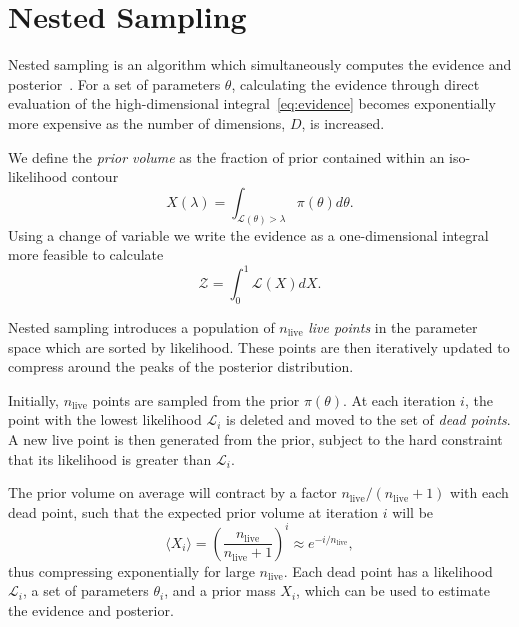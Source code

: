 \documentclass[11pt]{article}
\begin{document}
    \section{Nested Sampling}\label{sec:nested_sampling}
    Nested sampling is an algorithm which simultaneously computes
    the evidence and posterior~\cite{Skilling2006, Handley_polychord, NS_Review_2022}.
    For a set of parameters $\theta$, calculating the evidence through direct evaluation of the
    high-dimensional integral~\eqref{eq:evidence} becomes exponentially more expensive as the number of dimensions,
    $D$, is increased.

    We define the \emph{prior volume} as the fraction of prior contained within an iso-likelihood contour
    \begin{equation}\label{eq:prior_volume}
    X(\lambda) = \int_{\mathcal{L}(\theta)>\lambda} \pi(\theta) d\theta.
    \end{equation}
    Using a change of variable we write the evidence as a one-dimensional integral more feasible to calculate
    \begin{equation}\label{eq:evidence_ns}
    \mathcal{Z} = \int_0^1 {\mathcal{L}(X)} dX.
    \end{equation}

    Nested sampling introduces a population of $n_{\text{live}}$ \emph{live points} in the parameter space which are sorted
    by likelihood.
    These points are then iteratively updated to compress around the peaks of the posterior distribution.

    Initially, $n_{\text{live}}$ points are sampled from the prior $\pi(\theta)$.
    At each iteration $i$, the point with the lowest likelihood $\mathcal{L}_i$ is deleted and moved to the set
    of \emph{dead points}.
    A new live point is then generated from the prior, subject to the hard constraint that its likelihood is
    greater than $\mathcal{L}_i$.

    The prior volume on average will contract by a factor $n_{\text{live}}/(n_{\text{live}}+1)$ with each dead point, such that the
    expected prior volume at iteration $i$ will be
    \begin{equation}\label{eq:exp_prior_volume}
    \langle X_i \rangle = \left( \frac{n_{\text{live}}}{n_{\text{live}} + 1} \right)^i \approx e^{-i/n_{\text{live}}},
    \end{equation}
    thus compressing exponentially for large $n_{\text{live}}$.
    Each dead point has a likelihood $\mathcal{L}_i$, a set of parameters $\theta_i$, and a prior mass $X_i$, which can
    be used to estimate the evidence and posterior.
\end{document}
